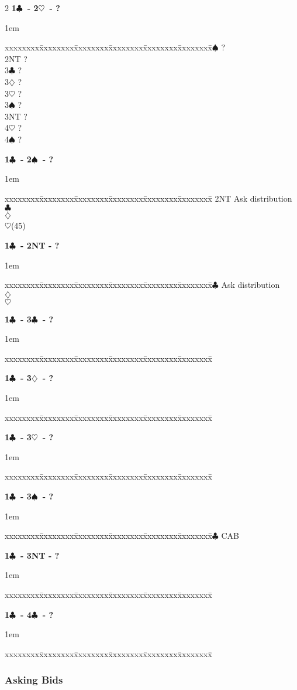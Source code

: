 \documentclass[10pt]{article}
\renewcommand{\c}{$\clubsuit$}
\renewcommand{\d}{$\diamondsuit$}
\newcommand{\h}{$\heartsuit$}
\newcommand{\s}{$\spadesuit$}
\newenvironment{bidtable}[1][]
{\textbf{#1}
  \begin{adjustwidth}{1em}{}
    \addvspace{2pt}
    \begin{tabbing}
      xxxxxxxx\=xxxxxxxx\=xxxxxxxx\=xxxxxxxx\=xxxxxxxx\=xxxxxxxx\=\kill}
{\end{tabbing}\end{adjustwidth}\bigskip}%
\begin{document}
\begin{multicols*}{2}
\begin{bidtable}[1\c\ - 2\h\ - ?]
2\s \> ? \\
2NT \> ? \\
3\c \> ? \\
3\d \> ? \\
3\h \> ? \\
3\s \> ? \\
3NT \> ? \\
4\h \> ? \\
4\s \> ?
\end{bidtable}

\begin{bidtable}[1\c\ - 2\s\ - ?]
2NT \> Ask distribution                        \\
    \c {}                        \\
    \d {}                        \\
    \h {}(45)
\end{bidtable}

\begin{bidtable}[1\c\ - 2NT - ?]
3\c \> Ask distribution    \\
    \d {}\\
    \h {}
\end{bidtable}

\begin{bidtable}[1\c\ - 3\c\ - ?]
\end{bidtable}

\begin{bidtable}[1\c\ - 3\d\ - ?]
\end{bidtable}

\begin{bidtable}[1\c\ - 3\h\ - ?]
\end{bidtable}

\begin{bidtable}[1\c\ - 3\s\ - ?]
4\c \> CAB
\end{bidtable}

\begin{bidtable}[1\c\ - 3NT - ?]
\end{bidtable}

\begin{bidtable}[1\c\ - 4\c\ - ?]
\end{bidtable}


\subsubsection{Asking Bids}


\end{multicols*}
\end{document}
